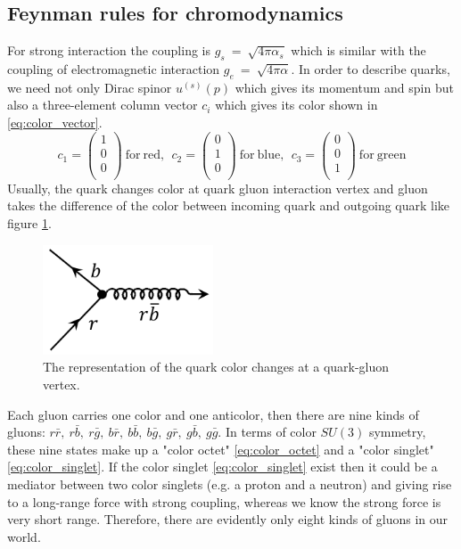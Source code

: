 \subsection{Feynman rules for chromodynamics}\label{subsec:Feynman_QCD}
For strong interaction the coupling is $g_{s}~=~\sqrt{4\pi\alpha_{s}}$ which is similar with the coupling of electromagnetic interaction $g_{e}~=~\sqrt{4\pi\alpha}$. In order to describe quarks, we need not only Dirac spinor $u^{(s)}(p)$ which gives its momentum and spin but also a three-element column vector $c_{i}$ which gives its color shown in \ref{eq:color_vector}.
\begin{equation}
c_{1}=\begin{pmatrix} 1 \\ 0 \\ 0 \\ \end{pmatrix}~\mathrm{for~red,~~}c_{2}=\begin{pmatrix} 0 \\ 1 \\ 0 \\ \end{pmatrix}~\mathrm{for~blue,~~}c_{3}=\begin{pmatrix} 0 \\ 0 \\ 1 \\ \end{pmatrix}~\mathrm{for~green}
\label{eq:color_vector}
\end{equation}
Usually, the quark changes color at quark gluon interaction vertex and gluon takes the difference of the color between incoming quark and outgoing quark like figure \ref{fig:color_change}.
\begin{figure}[h!]
 \begin{center}
\includegraphics[width=0.45\textwidth]{figures/theory/gluon_color.png}
\caption{The representation of the quark color changes at a quark-gluon vertex.}
  \label{fig:color_change}
 \end{center}
\end{figure}
Each gluon carries one color and one anticolor, then there are nine kinds of gluons: $r\bar{r},~r\bar{b},~r\bar{g},~b\bar{r},~b\bar{b},~b\bar{g},~g\bar{r},~g\bar{b},~g\bar{g}$. In terms of color $SU(3)$ symmetry, these nine states make up a "color octet" \ref{eq:color_octet} and a "color singlet" \ref{eq:color_singlet}. If the color singlet \ref{eq:color_singlet} exist then it could be a mediator between two color singlets (e.g. a proton and a neutron) and giving rise to a long-range force with strong coupling, whereas we know the strong force is very short range. Therefore, there are evidently only eight kinds of gluons in our world.
